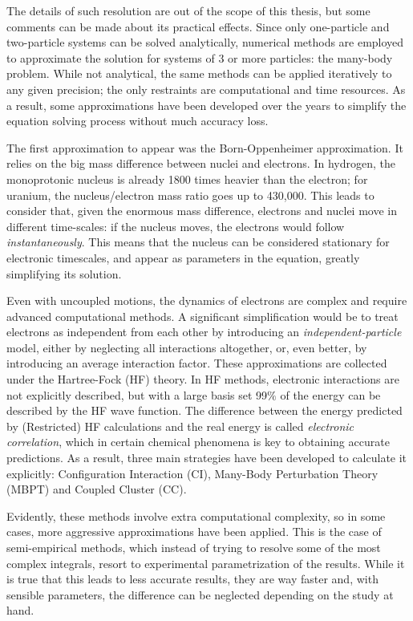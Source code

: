 The details of such resolution are out of the scope of this thesis, but some comments can be made about its practical effects. Since only one-particle and two-particle systems can be solved analytically, numerical methods are employed to approximate the solution for systems of 3 or more particles: the many-body problem. While not analytical, the same methods can be applied iteratively to any given precision; the only restraints are computational and time resources. As a result, some approximations have been developed over the years to simplify the equation solving process without much accuracy loss.

The first approximation to appear was the Born-Oppenheimer approximation. It relies on the big mass difference between nuclei and electrons. In hydrogen, the monoprotonic nucleus is already 1800 times heavier than the electron; for uranium, the nucleus/electron mass ratio goes up to 430,000. This leads to consider that, given the enormous mass difference, electrons and nuclei move in different time-scales: if the nucleus moves, the electrons would follow \textit{instantaneously}. This means that the nucleus can be considered stationary for electronic timescales, and appear as parameters in the equation, greatly simplifying its solution.

Even with uncoupled motions, the dynamics of electrons are complex and require advanced computational methods. A significant simplification would be to treat electrons as independent from each other by introducing an \textit{independent-particle} model, either by neglecting all interactions altogether, or, even better, by introducing an average interaction factor. These approximations are collected under the Hartree-Fock (HF) theory. In HF methods, electronic interactions are not explicitly described, but with a large basis set 99$\%$  of the energy can be described by the HF wave function. The difference between the energy predicted by (Restricted) HF calculations and the real energy is called \textit{electronic correlation}, which in certain chemical phenomena is key to obtaining accurate predictions. As a result, three main strategies have been developed to calculate it explicitly: Configuration Interaction (CI), Many-Body Perturbation Theory (MBPT) and Coupled Cluster (CC).

Evidently, these methods involve extra computational complexity, so in some cases, more aggressive approximations have been applied. This is the case of semi-empirical methods, which instead of trying to resolve some of the most complex integrals, resort to experimental parametrization of the results. While it is true that this leads to less accurate results, they are way faster and, with sensible parameters, the difference can be neglected depending on the study at hand.

